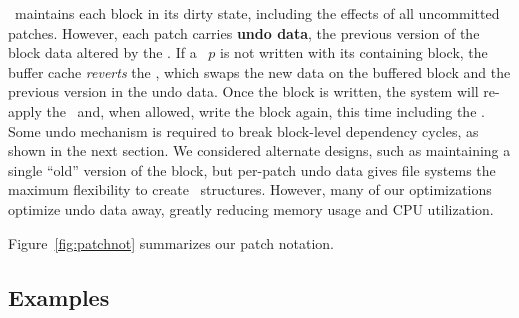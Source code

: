 %
\Featherstitch\ maintains each block in its dirty state, including the
 effects of all uncommitted patches.
%
However, each patch carries \textbf{undo data}, the 
 previous version of the block data altered by the \patch.
%
If a \patch\ $p$ is not written with its containing block, the buffer cache
 \emph{reverts} the \patch, which swaps the new data on the buffered block
 and the previous version in the undo data.
%
Once the block is written, the system will re-apply the \patch\ and, when
 allowed, write the block again, this time including the \patch.
%
Some undo mechanism is required to break block-level dependency cycles, as
 shown in the next section.
%
We considered alternate designs, such as maintaining a single ``old''
 version of the block, but per-patch undo data gives file systems the
 maximum flexibility to create \patch\ structures.
%
However, many of our optimizations optimize undo data away, greatly
 reducing memory usage and CPU utilization.

Figure~\ref{fig:patchnot} summarizes our patch notation.

\label{sec:patch:dependencies}

\begin{comment}
\paragraph{Example}
%
Suppose a \Kudos\ system contains the \patches\ in Figure~\ref{f:ex}c,
where the journal entry patches $d_\textrm{J}$, $i_\textrm{J}$, and
 $b_\textrm{J}$ have committed and all other patches have not.
%
The buffer cache cannot write blocks $\PBlock{b}$, $\PBlock{i}$, or $\PBlock{d}$,
since $\{b$, $i$, $i'$, $d\} \PDDepend \PXcmt$ and $\PXcmt \not\in \PDisk$.
%
Its only option is to write $\PBlock{\PXcmt}$ with $P = \{\PXcmt\}$, since
 $\PDepset{\PXcmt} = \{d_\textrm{J}$, $i_\textrm{J}$, $b_\textrm{J}\}
 \subseteq \PDisk$.
%
Since $\PXcmp$ has unmet dependencies on other blocks, it must be undone
 before the write and is excluded from $P$.
%
Later, when $\PXcmt$ commits, the buffer cache has the option to
write any of $\PBlock{b}$, $\PBlock{i}$, or $\PBlock{d}$.
\end{comment}


\subsection{Examples}
\label{sec:patch:examples}

